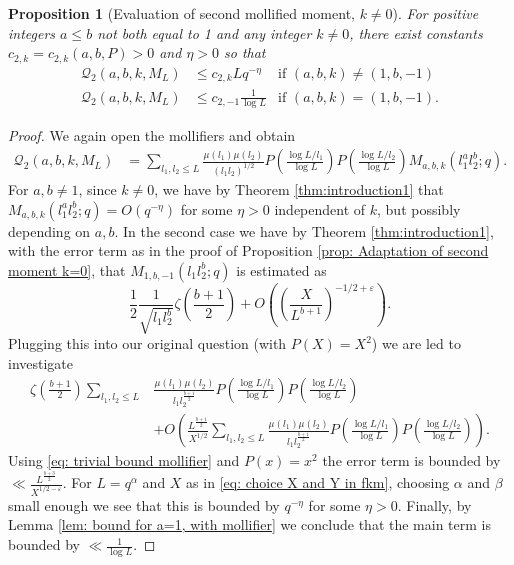 \documentclass[12pt]{amsart}
\theoremstyle{plain}
\newtheorem{prop}[thm]{Proposition}
\theoremstyle{definition}
\theoremstyle{remark}
\numberwithin{equation}{section}
\renewcommand{\leq}{\leqslant}
\begin{document}
\begin{prop}[Evaluation of second mollified moment, $k\neq 0$]\label{prop:secondmollifiedmomentkneq0}For positive integers $a\leq b$ not both equal to 1 and any integer $k\neq 0$, there exist constants $c_{2,k} = c_{2,k}(a,b,P)>0$ and $\eta >0$ so that 
    \begin{align*}
        \mathcal{Q}_2(a,b,k,M_L) &\leq c_{2,k}Lq^{-\eta} &\text{if }(a,b,k)\neq (1,b,-1) \\
        \mathcal{Q}_2(a,b,k,M_L) &\leq c_{2,-1}\frac{1}{\log L} &\text{if }(a,b,k)=(1,b,-1).
         \end{align*}
\end{prop}

\begin{proof}
    We again open the mollifiers and obtain 
    \begin{align*}
          \mathcal{Q}_2(a,b,k,M_L) &= \sum_{l_1,l_2\leq L}\frac{\mu(l_1)\mu(l_2)}{(l_1l_2)^{1/2}}P\left(\frac{\log L/l_1}{\log L}\right)P\left(\frac{\log L/l_2}{\log L}\right)M_{a,b,k}(l_1^al_2^b;q). 
    \end{align*}
   For $a,b\neq 1$, 
   since $k\neq 0$, we have by Theorem \ref{thm:introduction1} that $M_{a,b,k}(l_1^al_2^b;q) = O(q^{-\eta})$ for some $\eta >0$ independent of $k$, but possibly depending on $a,b$. 
In the second case we have by Theorem \ref{thm:introduction1}, with the error term as in the proof of Proposition \ref{prop: Adaptation of second moment k=0}, that $M_{1,b,-1}(l_1l_2^b;q)$ is estimated as $$\frac 12 \frac{1}{\sqrt{l_1l_2^b}}\zeta\left(\frac{b+1}{2}\right)+O\left(\left(\frac{X}{L^{b+1}}\right)^{-1/2+\varepsilon}\right).$$
Plugging this into our original question (with $P(X)=X^2$) we are led to investigate 
\begin{align*}
\zeta\left(\frac{b+1}{2}\right) \sum_{l_1,l_2\leq L}&\frac{\mu(l_1)\mu(l_2)}{l_1l_2^{\frac{b+1}{2}}}P\left(\frac{\log L/l_1}{\log L}\right)P\left(\frac{\log L/l_2}{\log L}\right)\\ &+O\left(\frac{L^{\frac{b+1}{2}}}{X^{1/2}}\sum_{l_1,l_2\leq L}\frac{\mu(l_1)\mu(l_2)}{l_1l_2^{\frac{b+1}{2}}} P\left(\frac{\log L/l_1}{\log L}\right)P\left(\frac{\log L/l_2}{\log L}\right)\right). 
\end{align*}
Using \eqref{eq: trivial bound mollifier} and $P(x)=x^2$ the error term is bounded by 
$ \ll \frac{L^{\frac{b+3}{2}}}{X^{1/2-\varepsilon}}.$ For $L=q^\alpha$ and $X$ as in \eqref{eq: choice X and Y in fkm}, choosing $\alpha$ and $\beta$ small enough we see that this is bounded by $q^{-\eta}$ for some $\eta>0$.
Finally, by Lemma \ref{lem: bound for a=1, with mollifier} we conclude that the main term is bounded by $\ll \frac{1}{\log L }$. 
\end{proof}
\end{document}

